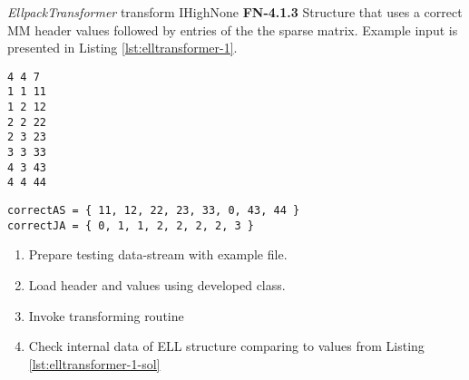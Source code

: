 \begin{testcase}{\emph{EllpackTransformer} transform I}{High}{None}
		{
			\textbf{FN-4.1.3}
		}
		{
			Structure that uses a correct \gls{MM} header values followed by entries of the the sparse matrix. Example input is presented in Listing \ref{lst:elltransformer-1}. 	
		}
		\begin{lstlisting}[label={lst:elltransformer-1},
			    basicstyle=\small,caption={\gls{MM} format data example}, frame=single]
%%MatrixMarket matrix coordinate real general
4 4 7
1 1 11
1 2 12
2 2 22
2 3 23
3 3 33
4 3 43
4 4 44
		\end{lstlisting}
		\begin{lstlisting}[label={lst:elltransformer-1-sol},
		basicstyle=\small,caption={\gls{ELL} format internal data example}, frame=single]
correctAS = { 11, 12, 22, 23, 33, 0, 43, 44 }
correctJA = { 0, 1, 1, 2, 2, 2, 2, 3 }
		\end{lstlisting}
		{
			\begin{enumerate}
				\item Prepare testing data-stream with example file.
				\item Load header and values using developed class.
				\item Invoke transforming routine 
				\item
				{
					Check internal data of \gls{ELL} structure comparing to values from Listing \ref{lst:elltransformer-1-sol} 
				}
			\end{enumerate}
		}
	\end{testcase}

